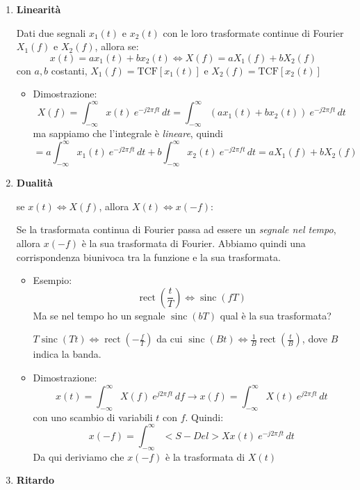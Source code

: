 \documentclass[
]{article}
\providecommand{\tightlist}{%
  \setlength{\itemsep}{0pt}\setlength{\parskip}{0pt}}
\begin{document}
\begin{enumerate}
\def\labelenumi{\arabic{enumi}.}
\setcounter{enumi}{12}
\item
  \textbf{Linearità}

  Dati due segnali \(x_1(t)\) e \(x_2(t)\) con le loro trasformate
  continue di Fourier \(X_1(f)\) e \(X_2(f)\), allora se: \[
  x(t) = ax_1(t) + bx_2(t) \Longleftrightarrow X(f)=aX_1(f)+bX_2(f)
  \] con \(a,b\) costanti, \(X_1(f)=\text{TCF}[x_1(t)]\) e
  \(X_2(f)=\text{TCF}[x_2(t)]\)

  \begin{itemize}
  \tightlist
  \item
    Dimostrazione: \[
      X(f)= \int_{-\infty}^{\infty}x(t)\ e^{-j2\pi ft}\,dt = \int_{-\infty}^{\infty}(ax_1(t) + bx_2(t)) \ e^{-j2\pi ft}\,dt
      \] ma sappiamo che l'integrale è \emph{lineare}, quindi \[
      = a\int_{-\infty}^{\infty}x_1(t)\ e^{-j2\pi ft}\,dt + b\int_{-\infty}^{\infty}x_2(t)\ e^{-j2\pi ft}\,dt = aX_1(f)+bX_2(f)
      \]
  \end{itemize}
\item
  \textbf{Dualità}

  se \(x(t)\Longleftrightarrow X(f)\), allora
  \(X(t)\Longleftrightarrow x(-f)\):

  Se la trasformata continua di Fourier passa ad essere un \emph{segnale
  nel tempo}, allora \(x(-f)\) è la sua trasformata di Fourier. Abbiamo
  quindi una corrispondenza biunivoca tra la funzione e la sua
  trasformata.

  \begin{itemize}
  \item
    Esempio: \[
      \mathop{\mathrm{rect}}(\frac{t}{T})\Longleftrightarrow\mathop{\mathrm{sinc}}(fT)
      \] Ma se nel tempo ho un segnale \(\mathop{\mathrm{sinc}}(bT)\)
    qual è la sua trasformata?

    \(T\mathop{\mathrm{sinc}}(Tt) \Longleftrightarrow \mathop{\mathrm{rect}}({-\frac{f}{T}})\)
    da cui
    \(\mathop{\mathrm{sinc}}(Bt)\Longleftrightarrow \frac{1}{B}\mathop{\mathrm{rect}}(\frac{t}{B})\),
    dove \(B\) indica la banda.
  \item
    Dimostrazione: \[
      x(t) =\int_{-\infty}^{\infty}X(f)\ e^{j2\pi ft} \,df \to x(f) = \int_{-\infty}^{\infty}X(t)\ e^{j2\pi ft} \,dt 
      \] con uno scambio di variabili \(t\) con \(f\). Quindi: \[
      x(-f)=\int_{-\infty}^{\infty}<S-Del>Xx(t)\ e^{-j2\pi ft} \,dt 
      \] Da qui deriviamo che \(x(-f)\) è la trasformata di \(X(t)\)
  \end{itemize}
\item
  \textbf{Ritardo}


\end{enumerate}
\end{document}
